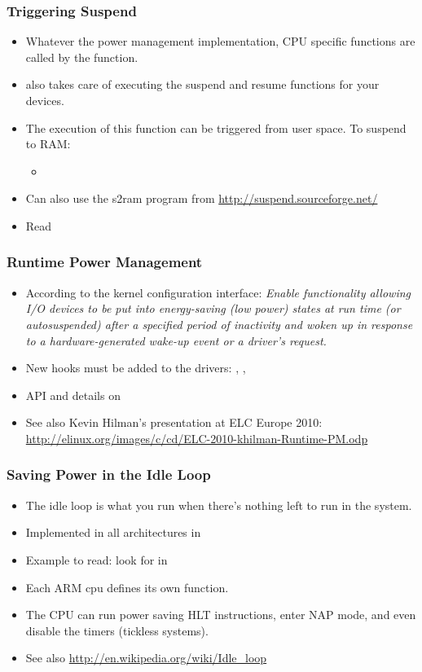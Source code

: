 \begin{frame}
  \frametitle{Triggering Suspend}
  \begin{itemize}
  \item Whatever the power management implementation, CPU specific
     functions are called by the 
    function.
  \item {} also takes care of executing the suspend
    and resume functions for your devices.
  \item The execution of this function can be triggered from
    user space. To suspend to RAM:
    \begin{itemize}
    \item {}
    \end{itemize}
  \item Can also use the s2ram program from
    \url{http://suspend.sourceforge.net/}
  \item Read 
  \end{itemize}
\end{frame}

\begin{frame}
  \frametitle{Runtime Power Management}
  \begin{itemize}
  \item According to the kernel configuration interface: \emph{Enable
      functionality allowing I/O devices to be put into energy-saving
      (low power) states at run time (or autosuspended) after a
      specified period of inactivity and woken up in response to a
      hardware-generated wake-up event or a driver's request.}
  \item New hooks must be added to the drivers:
    , ,
  \item API and details on 
  \item See also Kevin Hilman's presentation at ELC Europe 2010:
    \url{http://elinux.org/images/c/cd/ELC-2010-khilman-Runtime-PM.odp}
  \end{itemize}
\end{frame}

\begin{frame}
  \frametitle{Saving Power in the Idle Loop}
  \begin{itemize}
  \item The idle loop is what you run when there's nothing left to run
    in the system.
  \item Implemented in all architectures in
  \item Example to read: look for  in
  \item Each ARM cpu defines its own  function.
  \item The CPU can run power saving HLT instructions, enter NAP mode,
    and even disable the timers (tickless systems).
  \item See also \url{http://en.wikipedia.org/wiki/Idle_loop}
  \end{itemize}
\end{frame}

